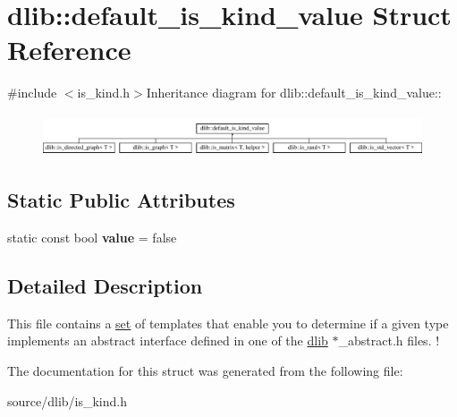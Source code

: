 \hypertarget{structdlib_1_1default__is__kind__value}{
\section{dlib::default\_\-is\_\-kind\_\-value Struct Reference}
\label{structdlib_1_1default__is__kind__value}
}


{\ttfamily \#include $<$is\_\-kind.h$>$}Inheritance diagram for dlib::default\_\-is\_\-kind\_\-value::\begin{figure}[H]
\begin{center}
\leavevmode
\includegraphics[height=1.2514cm]{structdlib_1_1default__is__kind__value}
\end{center}
\end{figure}
\subsection*{Static Public Attributes}
\begin{DoxyCompactItemize}
\item 
\hypertarget{structdlib_1_1default__is__kind__value_a64fbc73b0365a73a09f76b9ee31f60a8}{
static const bool {\bfseries value} = false}
\label{structdlib_1_1default__is__kind__value_a64fbc73b0365a73a09f76b9ee31f60a8}

\end{DoxyCompactItemize}


\subsection{Detailed Description}
This file contains a \hyperlink{classdlib_1_1set}{set} of templates that enable you to determine if a given type implements an abstract interface defined in one of the \hyperlink{namespacedlib}{dlib} $\ast$\_\-abstract.h files. ! 

The documentation for this struct was generated from the following file:\begin{DoxyCompactItemize}
\item 
source/dlib/is\_\-kind.h\end{DoxyCompactItemize}

